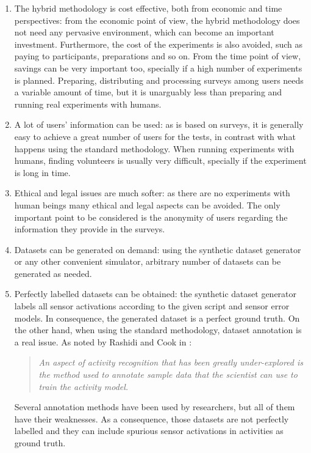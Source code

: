 \begin{enumerate}
 \item The hybrid methodology is cost effective, both from economic and time perspectives: from the economic point of view, the hybrid methodology does not need any pervasive environment, which can become an important investment. Furthermore, the cost of the experiments is also avoided, such as paying to participants, preparations and so on. From the time point of view, savings can be very important too, specially if a high number of experiments is planned. Preparing, distributing and processing surveys among users needs a variable amount of time, but it is unarguably less than preparing and running real experiments with humans. 
 \item A lot of users' information can be used: as is based on surveys, it is generally easy to achieve a great number of users for the tests, in contrast with what happens using the standard methodology. When running experiments with humans, finding volunteers is usually very difficult, specially if the experiment is long in time. 
 \item Ethical and legal issues are much softer: as there are no experiments with human beings many ethical and legal aspects can be avoided. The only important point to be considered is the anonymity of users regarding the information they provide in the surveys.
 \item Datasets can be generated on demand: using the synthetic dataset generator or any other convenient simulator, arbitrary number of datasets can be generated as needed.
 \item Perfectly labelled datasets can be obtained: the synthetic dataset generator labels all sensor activations according to the given script and sensor error models. In consequence, the generated dataset is a perfect ground truth. On the other hand, when using the standard methodology, dataset annotation is a real issue. As noted by Rashidi and Cook in \cite{Rashidi2011}: \blockquote{\textit{An aspect of activity recognition that has been greatly under-explored is the method used to annotate sample data that the scientist can use to train the activity model.}} Several annotation methods have been used by researchers, but all of them have their weaknesses. As a consequence, those datasets are not perfectly labelled and they can include spurious sensor activations in activities as ground truth.

\end{enumerate}
